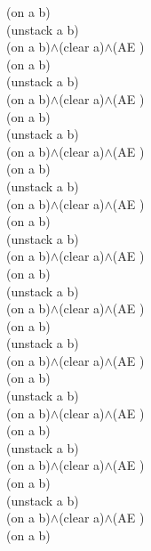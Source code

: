 {{(on a b)\\
(unstack a b)\\
(on a b)$\wedge$(clear a)$\wedge$(AE )\\
(on a b)\\
(unstack a b)\\
(on a b)$\wedge$(clear a)$\wedge$(AE )\\
(on a b)\\
(unstack a b)\\
(on a b)$\wedge$(clear a)$\wedge$(AE )\\
(on a b)\\
(unstack a b)\\
(on a b)$\wedge$(clear a)$\wedge$(AE )\\
(on a b)\\
(unstack a b)\\
(on a b)$\wedge$(clear a)$\wedge$(AE )\\
(on a b)\\
(unstack a b)\\
(on a b)$\wedge$(clear a)$\wedge$(AE )\\
(on a b)\\
(unstack a b)\\
(on a b)$\wedge$(clear a)$\wedge$(AE )\\
(on a b)\\
(unstack a b)\\
(on a b)$\wedge$(clear a)$\wedge$(AE )\\
(on a b)\\
(unstack a b)\\
(on a b)$\wedge$(clear a)$\wedge$(AE )\\
(on a b)\\
(unstack a b)\\
(on a b)$\wedge$(clear a)$\wedge$(AE )\\
(on a b)\\
}%
}

